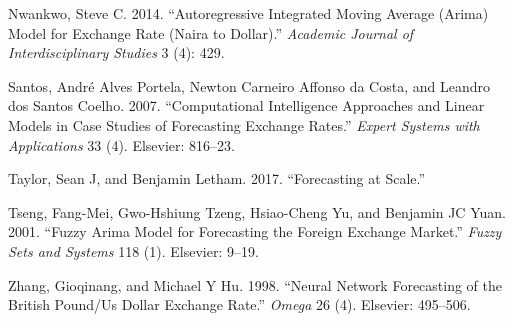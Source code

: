 \documentclass[12pt,a4paper]{article}
\numberwithin{equation}{section}
\numberwithin{figure}{section}
\numberwithin{table}{section}
\renewcommand{\baselinestretch}{1.5}
\begin{document}
\hypertarget{ref-nwankwo2014}{}
Nwankwo, Steve C. 2014. ``Autoregressive Integrated Moving Average
(Arima) Model for Exchange Rate (Naira to Dollar).'' \emph{Academic
Journal of Interdisciplinary Studies} 3 (4): 429.

\hypertarget{ref-santos2007}{}
Santos, André Alves Portela, Newton Carneiro Affonso da Costa, and
Leandro dos Santos Coelho. 2007. ``Computational Intelligence Approaches
and Linear Models in Case Studies of Forecasting Exchange Rates.''
\emph{Expert Systems with Applications} 33 (4). Elsevier: 816--23.

\hypertarget{ref-taylor2017}{}
Taylor, Sean J, and Benjamin Letham. 2017. ``Forecasting at Scale.''

\hypertarget{ref-tseng2001}{}
Tseng, Fang-Mei, Gwo-Hshiung Tzeng, Hsiao-Cheng Yu, and Benjamin JC
Yuan. 2001. ``Fuzzy Arima Model for Forecasting the Foreign Exchange
Market.'' \emph{Fuzzy Sets and Systems} 118 (1). Elsevier: 9--19.

\hypertarget{ref-zhang1998}{}
Zhang, Gioqinang, and Michael Y Hu. 1998. ``Neural Network Forecasting
of the British Pound/Us Dollar Exchange Rate.'' \emph{Omega} 26 (4).
Elsevier: 495--506.

\newpage
\renewcommand{\baselinestretch}{1}
\nocite{*}

\end{document}
